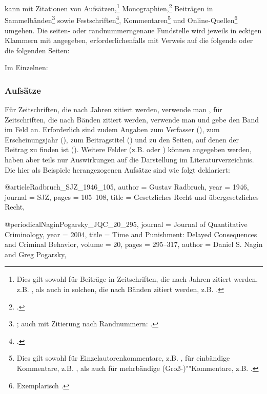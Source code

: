 \documentclass{ltxdockit}[2010/09/26]
\begin{document}
 kann mit Zitationen von Aufsätzen,\footnote{Dies gilt sowohl für Beiträge in Zeitschriften, die nach Jahren zitiert werden, z.B. \cite[107]{Radbruch_SJZ_1946_105}, als auch in solchen, die nach Bänden zitiert werden, z.B. \cite[295 \psqq]{NaginPogarsky_JQC_20_295}.} Monographien,\footcite[4]{Brodowski:2016} Beiträgen in Sammelbänden\footnote{\cite[211]{Vogel_Beck:2011}; auch mit Zitierung nach Randnummern: \cite[3 \psqq]{Moestl_HdbStR:179:2010}.} sowie Festschriften\footcite[408 \psq]{Koriath_FS_Jung}, Kommentaren\footnote{Dies gilt sowohl für Einzelautorenkommentare, z.B. \cite[\S\,248c Rn.~1 \psqq{}]{Fischer66}, für einbändige Kommentare, z.B. \cite[Bosch][§\,248c Rn.~1 \psq{}]{SchoenkeSchroeder30}, als auch für mehrbändige \mbox{(Groß-)}""Kommentare, z.B. \cite[Lüderssen/Jahn][§\,140 Rn.~1]{LR26}.} und Online-Quellen\footnote{Exemplarisch \cite{Mordkommission:2015}.} umgehen. Die seiten- oder randnummerngenaue Fundstelle wird jeweils in eckigen Klammern mit angegeben, erforderlichenfalls mit Verweis auf die folgende oder die folgenden Seiten:

\begin{ltxcode}
\cite[295 \psqq]{NaginPogarsky_JQC_20_295}
\cite[408 \psq]{Koriath_FS_Jung}
\end{ltxcode}

Im Einzelnen:

\subsubsection{Aufsätze}

Für Zeitschriften, die nach Jahren zitiert werden, verwende man , für Zeitschriften, die nach Bänden zitiert werden, verwende man  und gebe den Band im Feld  an. Erforderlich sind zudem Angaben zum Verfasser (), zum Erscheinungsjahr (), zum Beitragstitel () und zu den Seiten, auf denen der Beitrag zu finden ist (). Weitere Felder (z.B.  oder ) können angegeben werden, haben aber teils nur Auswirkungen auf die Darstellung im Literaturverzeichnis. Die hier als Beispiele herangezogenen Aufsätze sind wie folgt deklariert:

\begin{ltxcode}
@article{Radbruch_SJZ_1946_105,
author = {Gustav Radbruch},
year = {1946},
journal = {SJZ},
pages = {105--108},
title = {Gesetzliches Recht und übergesetzliches Recht},
}

@periodical{NaginPogarsky_JQC_20_295,
journal = {Journal of Quantitative Criminology},
year = {2004},
title = {Time and Punishment: Delayed Consequences and Criminal Behavior},
volume = {20},
pages = {295--317},
author = {Daniel S. Nagin and Greg Pogarsky},
}
\end{ltxcode}
\end{document}
